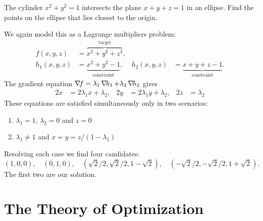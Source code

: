 \begin{example}
The cylinder $x^2+y^2=1$ intersects the plane $x+y+z=1$ in an ellipse.  Find the points on the ellipse that lies closest to the origin.

We again model this as a Lagrange multipliers problem:
\begin{align*}
f(x,y,z) &= \overbrace{x^2+y^2+z^2}^{\text{target}}, \\ 
h_1(x,y,z)&= \underbrace{x^2+y^2-1}_{\text{constraint}}, & h_2(x,y,z) &= \underbrace{x+y+z-1}_{\text{constraint}}.
\end{align*}
The gradient equation $\mathop{\nabla\! {f}} = \lambda_1 \mathop{\nabla\! {h_1}} + \lambda_2 \mathop{\nabla\! {h_2}}$ gives
\begin{align*}
2x &= 2\lambda_1 x + \lambda_2, &2y &= 2\lambda_1 y+\lambda_2, &2z &= \lambda_2
\end{align*}
These equations are satisfied simultaneously only in two scenarios:
\begin{enumerate}
	\item $\lambda_1=1$, $\lambda_2=0$ and $z=0$
	\item $\lambda_1 \neq 1$ and $x=y=z/(1-\lambda_1)$
\end{enumerate} 
Resolving each case we find four candidates: 
\begin{equation*}
(1,0,0), \quad(0,1,0), \quad (\sqrt{2}/2, \sqrt{2}/2, 1- \sqrt{2}), \quad(-\sqrt{2}/2, -\sqrt{2}/2, 1+\sqrt{2}).
\end{equation*}  
The first two are our solution.
\end{example}

\section*{The Theory of Optimization}

